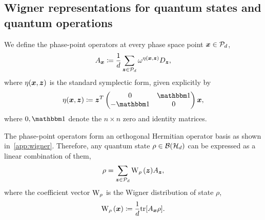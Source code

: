 \documentclass[pra,
aps,
twocolumn,
superscriptaddress,
groupedaddress,
nofootinbib,
reprint
]{revtex4-1}
\begin{document}
\subsection{Wigner representations for quantum states and quantum operations}\label{sec:wigner}

We define the phase-point operators at every phase space point $\bmx \in \cal{P}_d$,
\begin{align}
	A_{\bmx} \coloneqq \frac{1}{d} \sum_{\bmz \in \cal{P}_d} \omega^{\eta(\bmx, \bmz)} D_{\bmz}, \label{eq:ax}
\end{align}
where $\eta(\bmx, \bmz)$ is the standard symplectic form, given explicitly by
\begin{equation}
	\eta(\bmx, \bmz) \coloneqq \bmz^T \begin{pmatrix}
		0  & \id \\ %
		-\id & 0 \\ %
	\end{pmatrix} \bmx,
\end{equation}
where $0, \id$ denote the $n\times n$ zero and identity matrices.

The phase-point operators form an orthogonal Hermitian operator basis as shown in~\cref{app:wigner}.
Therefore, any quantum state $\rho \in \cal{B}(\cal{H}_d)$ can be expressed as a linear combination of them,
\begin{equation}
    \rho = \sum_{\bmz \in \cal{P}_d} \W[\bmz]{\rho} A_{\bmz},
\end{equation}
where the coefficient vector $\W{\rho}$ is the Wigner distribution of state $\rho$,
\begin{equation}\label{eq:wstate}
    \W[\bmx]{\rho} \coloneqq \frac{1}{d}\tr[A_{\bmx} \rho].
\end{equation}
\end{document}
